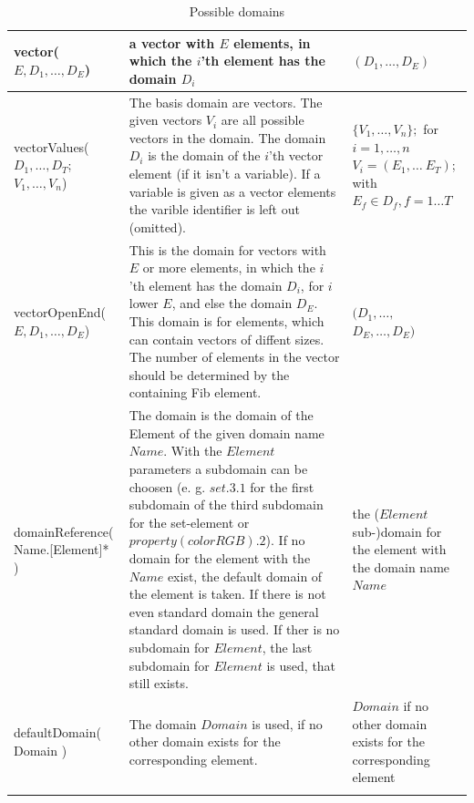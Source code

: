 \begin{center}
\begin{longtable}{|p{30mm}|p{55mm}|p{40mm}|}
	vector( $E , D_1, \ldots , D_E$) & a vector with $E$ elements, in which the $i$'th element has the domain $D_i$ & $(D_1, \ldots , D_E)$\\\hline
	vectorValues( $D_1, \ldots , D_T$; $V_1, \ldots , V_n$) & The basis domain are vectors. The given vectors $V_i$ are all possible vectors in the domain. The domain $D_i$ is the domain of the $i$'th vector element (if it isn't a variable). If a variable is given as a vector elements the varible identifier is left out (omitted). & $\{ V_1, \ldots , V_n \};$ for $i=1, \ldots, n$ $V_i = (E_1, \ldots \ E_T )$; with $E_f \in D_f, f=1 \ldots T$\\\hline
	vectorOpenEnd( $E , D_1, \ldots , D_E$) & This is the domain for vectors with $E$ or more elements, in which the $i$'th element has the domain $D_i$, for $i$ lower $E$, and else the domain $D_E$. This domain is for elements, which can contain vectors of diffent sizes. The number of elements in the vector should be determined by the containing Fib element. & $(D_1, \ldots ,$ $D_E, \ldots, D_E)$\\\hline

	domainReference( Name.[Element]* ) & The domain is the domain of the Element of the given domain name $Name$. With the $Element$ parameters a subdomain can be choosen (e. g. $set.3.1$ for the first subdomain of the third subdomain for the set-element or $property( colorRGB).2$). If no domain for the element with the $Name$ exist, the default domain of the element is taken. If there is not even standard domain the general standard domain is used. If ther is no subdomain for $Element$, the last subdomain for $Element$ is used, that still exists. & the ($Element$  sub-)domain for the element with the domain name $Name$  \\\hline

	defaultDomain( Domain ) & The domain $Domain$ is used, if no other domain exists for the corresponding element. & $Domain$ if no other domain exists for the corresponding element \\\hline

\caption{Possible domains}
\label{tableDomains}
\end{longtable}
\end{center}


